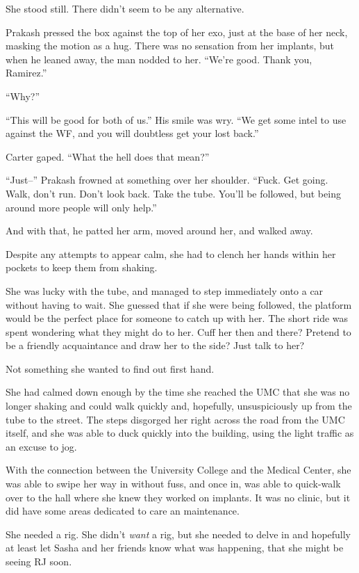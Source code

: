 She stood still. There didn't seem to be any alternative.

Prakash pressed the box against the top of her exo, just at the base of her neck, masking the motion as a hug. There was no sensation from her implants, but when he leaned away, the man nodded to her. ``We're good. Thank you, Ramirez.''

``Why?''

``This will be good for both of us.'' His smile was wry. ``We get some intel to use against the WF, and you will doubtless get your lost back.''

Carter gaped. ``What the hell does that mean?''

``Just--'' Prakash frowned at something over her shoulder. ``Fuck. Get going. Walk, don't run. Don't look back. Take the tube. You'll be followed, but being around more people will only help.''

And with that, he patted her arm, moved around her, and walked away.

Despite any attempts to appear calm, she had to clench her hands within her pockets to keep them from shaking.

She was lucky with the tube, and managed to step immediately onto a car without having to wait. She guessed that if she were being followed, the platform would be the perfect place for someone to catch up with her. The short ride was spent wondering what they might do to her. Cuff her then and there? Pretend to be a friendly acquaintance and draw her to the side? Just talk to her?

Not something she wanted to find out first hand.

She had calmed down enough by the time she reached the UMC that she was no longer shaking and could walk quickly and, hopefully, unsuspiciously up from the tube to the street. The steps disgorged her right across the road from the UMC itself, and she was able to duck quickly into the building, using the light traffic as an excuse to jog.

With the connection between the University College and the Medical Center, she was able to swipe her way in without fuss, and once in, was able to quick-walk over to the hall where she knew they worked on implants. It was no clinic, but it did have some areas dedicated to care an maintenance.

She needed a rig. She didn't \emph{want} a rig, but she needed to delve in and hopefully at least let Sasha and her friends know what was happening, that she might be seeing RJ soon.

